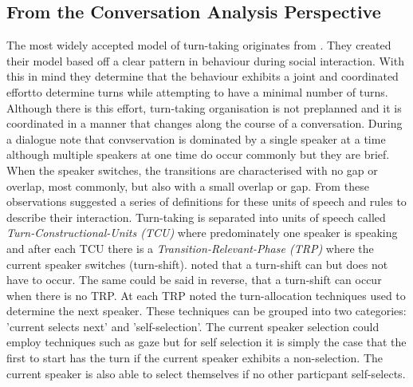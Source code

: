 \documentclass[logo,bsc,singlespacing,parskip]{infthesis}
\begin{document}
\subsection{From the Conversation Analysis Perspective}
The most widely accepted model of turn-taking originates from \cite{Sacks1974}. They created their model based off a clear pattern in behaviour during social interaction. With this in mind they determine that the behaviour exhibits a joint and coordinated effortto determine turns while attempting to have a minimal number of turns. Although there is this effort, turn-taking organisation is not preplanned and it is coordinated in a manner that changes along the course of a conversation. During a dialogue \cite{Sacks1974} note that convservation is dominated by a single speaker at a time although multiple speakers at one time do occur commonly but they are brief. When the speaker switches, the transitions are characterised with no gap or overlap, most commonly, but also with a small overlap or gap. From these observations \cite{Sacks1974} suggested a series of definitions for these units of speech and rules to describe their interaction. Turn-taking is separated into units of speech called \textit{Turn-Constructional-Units (TCU)} where predominately one speaker is speaking and after each TCU there is a \textit{Transition-Relevant-Phase (TRP)} where the current speaker switches (turn-shift). 
\cite{Sacks1974} noted that a turn-shift can but does not have to occur. The same could be said in reverse, that a turn-shift can occur when there is no TRP. At each TRP  \cite{Sacks1974} noted the turn-allocation techniques used to determine the next speaker. These techniques can be grouped into two categories: 'current selects next' and 'self-selection'. The current speaker selection could employ techniques such as gaze but for self selection it is simply the case that the first to start has the turn if the current speaker exhibits a non-selection. The current speaker is also able to select themselves if no other particpant self-selects. 
\end{document}
